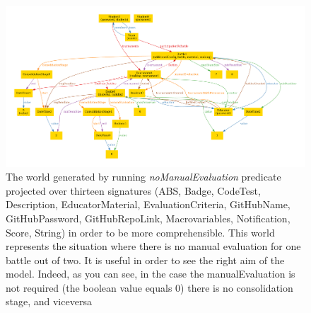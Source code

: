 \begin{figure}[h]
  \centering
  \includegraphics[width=1.1\linewidth]{4Alloy/res/noManualEvaluation.pdf}
  \caption{The world generated by running \textit{noManualEvaluation} predicate projected over thirteen signatures (ABS, Badge, CodeTest, Description, EducatorMaterial, EvaluationCriteria, GitHubName, GitHubPassword, GitHubRepoLink, Macrovariables, Notification, Score, String) in order to be more comprehensible. This world represents the situation where there is no manual evaluation for one battle out of two. It is useful in order to see the right aim of the model. Indeed, as you can see, in the case the manualEvaluation is not required (the boolean value equals 0) there is no consolidation stage, and viceversa}
\end{figure}

